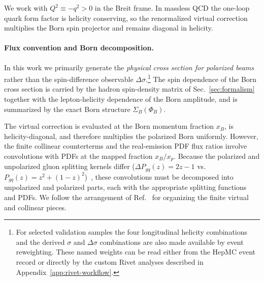 \documentclass[a4paper,11pt]{article}
\begin{document}
We work with $Q^2\equiv -q^2>0$ in the Breit frame. In massless QCD the one-loop quark form factor is helicity conserving, so the renormalized virtual correction multiplies the Born spin projector and remains diagonal in helicity.

\paragraph{Flux convention and Born decomposition.}
In this work we primarily generate the \emph{physical cross section for polarized beams} rather than the spin-difference observable $\Delta\sigma$.\footnote{For selected validation samples the four longitudinal helicity combinations and the derived $\sigma$ and $\Delta\sigma$ combinations are also made available by event reweighting. These named weights can be read either from the HepMC event record or directly by the custom Rivet analyses described in Appendix~\ref{app:rivet-workflow}.}
The spin dependence of the Born cross section is carried by the hadron spin-density matrix of Sec.~\ref{sec:formalism} together with the lepton-helicity dependence of the Born amplitude, and is summarized by the exact Born structure $\Sigma_B(\Phi_B)$.

The virtual correction is evaluated at the Born momentum fraction $x_B$, is helicity-diagonal, and therefore multiplies the polarized Born uniformly.
However, the finite collinear counterterms and the real-emission PDF flux ratios involve convolutions with PDFs at the mapped fraction $x_B/x_p$.  Because the polarized and unpolarized gluon splitting kernels differ ($\Delta P_{gq}(z) = 2z-1$ vs.\ $P_{gq}(z) = z^2+(1{-}z)^2$)~\cite{Altarelli:1977zs,Mertig:1995ny}, these convolutions must be decomposed into unpolarized and polarized parts, each with the appropriate splitting functions and PDFs.
We follow the arrangement of Ref.~\cite{DErrico:2011wfa} for organizing the finite virtual and collinear pieces.
\end{document}
